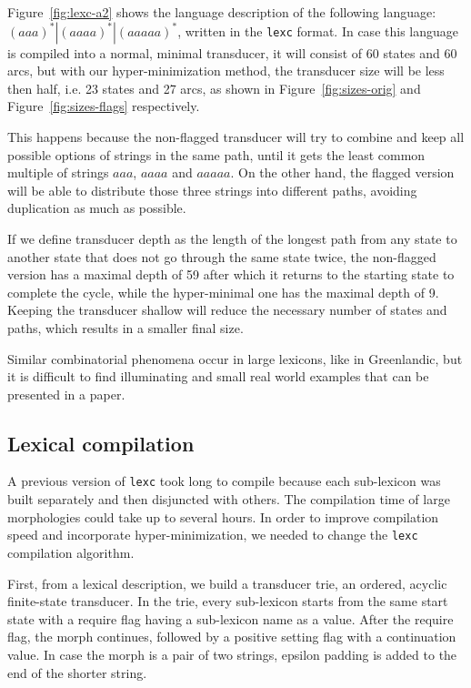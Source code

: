\documentclass[11pt]{article}
\begin{document}
Figure~\ref{fig:lexc-a2} shows the language description of the following language: $(aaa)^*|(aaaa)^*|(aaaaa)^*$, written in 
the \texttt{lexc} format. In case this language is compiled into a normal, minimal transducer, it will consist of 60 states and 60 arcs, 
but with our hyper-minimization method, the transducer size will be less then half, i.e.  23 states and 27 arcs, as shown in 
Figure~\ref{fig:sizes-orig} and Figure~\ref{fig:sizes-flags} respectively.

This happens because the non-flagged transducer will try to combine and keep all possible options of strings in the same path, until it gets 
the least common multiple of strings $aaa$, $aaaa$ and $aaaaa$. On the other hand, the flagged version will be able to distribute those three 
strings into different paths, avoiding duplication as much as possible.


If we define transducer depth as the length of the longest path from any state to another state that does not go through the same state twice, 
the non-flagged version has a maximal depth of 59 after which it returns to the starting state to complete the cycle, while the hyper-minimal 
one has the maximal depth of 9. Keeping the transducer shallow will reduce the necessary number of states and paths, which results in a smaller final size.

Similar combinatorial phenomena occur in large lexicons, like in Greenlandic, but it is difficult to find illuminating and small real 
world examples that can be presented in a paper.


\subsection{Lexical compilation}

A previous version of \texttt{lexc} took long to compile because each sub-lexicon was built separately and then disjuncted with others. The compilation time of large morphologies could take up to several hours. In order to improve compilation speed and incorporate hyper-minimization, we needed to change the \texttt{lexc} compilation algorithm.

First, from a lexical description, we build a transducer trie, an ordered, acyclic finite-state transducer. In the trie, every sub-lexicon 
starts from the same start state with a require flag having a sub-lexicon name as a value. After the require flag, the morph continues, followed 
by a positive setting flag with a continuation value. In case the morph is a pair of two strings, epsilon padding is added to the end of 
the shorter string.
\end{document}
